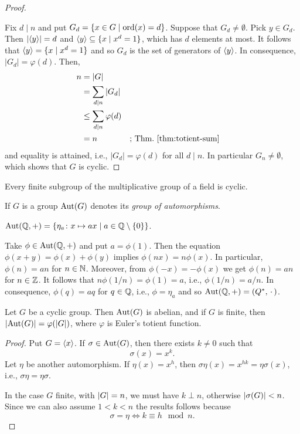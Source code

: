 \begin{proof} \citep{59911}

    Fix $d\mid n$ and put $G_d=\{x\in G\mid {\rm ord}(x)=d\}$. Suppose that $G_d\ne\emptyset$. Pick $y\in G_d$. Then $|\langle y\rangle|=d$ and $\langle y\rangle\subseteq\{x\mid x^d=1\}$, which has $d$ elements at most. It follows that $\langle y\rangle=\{x\mid x^d=1\}$ and so $G_d$ is the set of generators of $\langle y\rangle$. In consequence, $|G_d|=\varphi(d)$. Then,
    \begin{align*}
        n &= |G|\\
            &= \sum_{d\mid n}|G_d|\\
            &\le \sum_{d\mid n}\varphi(d)\\
            &= n    &&\text{; Thm.~\ref{thm:totient-sum}}
    \end{align*}
    and equality is attained, i.e., $|G_d|=\varphi(d)$ for all $d\mid n$. In particular $G_n\ne\emptyset$, which shows that $G$ is cyclic.
\end{proof}

\begin{cor}\label{cor:multiplicative-subgroup-of-field-is-cyclic}
    Every finite subgroup of the multiplicative group of a field is cyclic.
\end{cor}

\begin{ntn}
    If\/ $G$ is a group  ${\rm Aut}(G)$ denotes its \textsl{group of automorphisms}.
\end{ntn}

\begin{xmpl}\label{xmpl:Aut(Q,+)}
    ${\rm Aut}(\mathbb{Q},+)=\{\eta_a\colon x\mapsto ax\mid a\in\mathbb{Q}\setminus\{0\}\}$.

    Take $\phi\in{\rm Aut}(\mathbb{Q},+)$ and put $a=\phi(1)$. Then the equation $\phi(x+y)=\phi(x)+\phi(y)$ implies $\phi(nx)=n\phi(x)$. In particular, $\phi(n)=an$ for $n\in\mathbb{N}$. Moreover, from $\phi(-x)=-\phi(x)$ we get $\phi(n)=an$ for $n\in\mathbb{Z}$. It follows that $n\phi(1/n)=\phi(1)=a$, i.e., $\phi(1/n)=a/n$. In consequence, $\phi(q)=aq$ for $q\in\mathbb{Q}$, i.e., $\phi=\eta_a$ and so ${\rm Aut}(\mathbb{Q},+)=(Q^*,\,\cdot\,)$.
\end{xmpl}


\begin{lem}
    Let $G$ be a cyclic group. Then ${\rm Aut}(G)$ is abelian, and if\/ $G$ is finite, then $|{\rm Aut}(G)| = \varphi(|G|)$, where $\varphi$ is Euler's totient function.
\end{lem}

\begin{proof} Put $G=\langle x\rangle$. If\/ $\sigma\in{\rm Aut}(G)$, then there exists $k\ne0$ such that
$$
    \sigma(x)=x^k.
$$
Let $\eta$ be another automorphism. If $\eta(x)=x^h$, then $\sigma\eta(x)=x^{hk}=\eta\sigma(x)$, i.e., $\sigma\eta=\eta\sigma$.

In the case $G$ finite, with $\left\vert{G}\right\vert=n$, we must have $k\perp n$, otherwise $\left\vert{\sigma(G)}\right\vert < n$. Since we can also assume $1<k<n$ the results follows because
$$
    \sigma=\eta \iff k\equiv h\mod n.
$$
 \end{proof}


